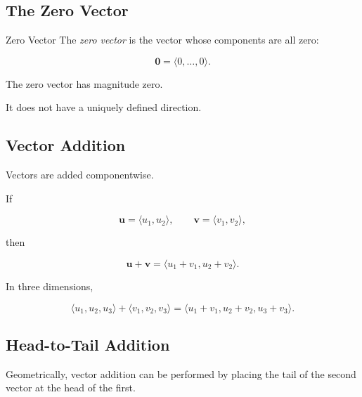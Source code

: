 \subsection{The Zero Vector}
\label{subsec:zero-vector-geometry}

\begin{definitionbox}{Zero Vector}
The \emph{zero vector} is the vector whose components are all zero:

\[ \boxed{\mathbf{0}=\langle0,\ldots,0\rangle.} \]
\end{definitionbox}

The zero vector has magnitude zero.

It does not have a uniquely defined direction.

\subsection{Vector Addition}
\label{subsec:vector-addition-geometry}

Vectors are added componentwise.

If

\[
\mathbf{u}=\langle u_1,u_2\rangle,\qquad
\mathbf{v}=\langle v_1,v_2\rangle,
\]

then

\[ \boxed{\mathbf{u}+\mathbf{v}=\langle u_1+v_1,u_2+v_2\rangle.} \]

In three dimensions,

\[
\boxed{
\langle u_1,u_2,u_3\rangle+
\langle v_1,v_2,v_3\rangle
=
\langle u_1+v_1,u_2+v_2,u_3+v_3\rangle.
}
\]

\subsection{Head-to-Tail Addition}
\label{subsec:head-tail-addition}

Geometrically, vector addition can be performed by placing the tail of the
second vector at the head of the first.

\begin{centereddiagram}
\end{centereddiagram}

